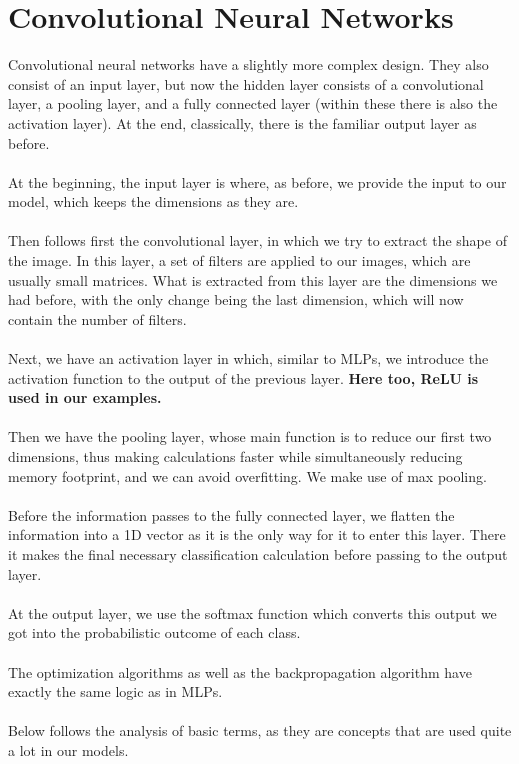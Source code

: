 \documentclass[11pt, letterpaper]{article}
\begin{document}
\section*{Convolutional Neural Networks}
Convolutional neural networks have a slightly more complex design. They also consist of an input layer, but now the hidden layer consists of a convolutional layer, a pooling layer, and a fully connected layer (within these there is also the activation layer). At the end, classically, there is the familiar output layer as before. \\ \\
At the beginning, the input layer is where, as before, we provide the input to our model, which keeps the dimensions as they are. \\ \\
Then follows first the convolutional layer, in which we try to extract the shape of the image. In this layer, a set of filters are applied to our images, which are usually small matrices. What is extracted from this layer are the dimensions we had before, with the only change being the last dimension, which will now contain the number of filters. \\ \\
Next, we have an activation layer in which, similar to MLPs, we introduce the activation function to the output of the previous layer. \textbf{Here too, ReLU is used in our examples.} \\ \\
Then we have the pooling layer, whose main function is to reduce our first two dimensions, thus making calculations faster while simultaneously reducing memory footprint, and we can avoid overfitting. We make use of max pooling. \\ \\
Before the information passes to the fully connected layer, we flatten the information into a 1D vector as it is the only way for it to enter this layer. There it makes the final necessary classification calculation before passing to the output layer. \\ \\
At the output layer, we use the softmax function which converts this output we got into the probabilistic outcome of each class. \\ \\
The optimization algorithms as well as the backpropagation algorithm have exactly the same logic as in MLPs. \\ \\
Below follows the analysis of basic terms, as they are concepts that are used quite a lot in our models.
\end{document}
